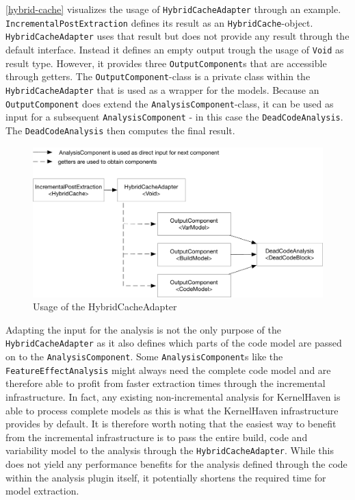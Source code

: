 \documentclass[a4paper]{article}
\begin{document}
\autoref{hybrid-cache} visualizes the usage of \texttt{Hybrid\-Cache\-Adapter} through an example. \texttt{Incremental\-Post\-Extraction} defines its result as an \texttt{Hybrid\-Cache}-object. \texttt{Hybrid\-Cache\-Adapter} uses that result but does not provide any result through the default interface. Instead it defines an empty output trough the usage of \texttt{Void} as result type. However, it provides three \texttt{Output\-Component}s that are accessible through getters. The \texttt{Output\-Component}-class is a private class within the \texttt{Hybrid\-Cache\-Adapter} that is used as a wrapper for the models. Because an \texttt{Output\-Component} does extend the \texttt{Analysis\-Component}-class, it can be used as input for a subsequent \texttt{Analysis\-Component} - in this case the \texttt{Dead\-Code\-Analysis}. The \texttt{Dead\-Code\-Analysis} then computes the final result.

\begin{figure}[h] 
  \centering
  \begin{minipage}[b]{1\textwidth} 
    \caption[Usage of the HybridCacheAdapter]{Usage of the HybridCacheAdapter}\label{hybrid-cache}
    \includegraphics[width=1\textwidth]{img/HybridCacheAdapter.pdf}
  \end{minipage}
\end{figure}

Adapting the input for the analysis is not the only purpose of the \texttt{Hybrid\-Cache\-Adapter} as it also defines which parts of the code model are passed on to the \texttt{Analysis\-Component}. Some  \texttt{Analysis\-Component}s like the \texttt{Feature\-Effect\-Analysis} \cite{feature-effect-analysis}\cite{Nadi15wheredo} might always need the complete code model and are therefore able to profit from faster extraction times through the incremental infrastructure. In fact, any existing non-incremental analysis for KernelHaven is able to process complete models as this is what the KernelHaven infrastructure provides by default. It is therefore worth noting that the easiest way to benefit from the incremental infrastructure is to pass the entire build, code and variability model to the analysis through the \texttt{Hybrid\-Cache\-Adapter}. While this does not yield any performance benefits for the analysis defined through the code within the analysis plugin itself, it potentially shortens the required time for model extraction.
\end{document}

